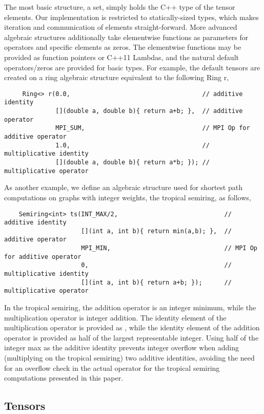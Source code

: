 The most basic structure, a set, simply holds the C++ type of the tensor elements.
Our implementation is restricted to statically-sized types, which makes iteration and communication of elements straight-forward.
More advanced algebraic structures additionally take elementwise functions as parameters for operators and specific elements as zeros.
The elementwise functions may be provided as function pointers or C++11 Lambdas, and the natural default operators/zeros are provided for basic types.
For example, the default tensors are created on a ring algebraic structure equivalent to the following {\kwstyle Ring} {\CD r},
\begin{lstlisting}
     Ring<> r(0.0,                                    // additive identity
              [](double a, double b){ return a+b; },  // additive operator
              MPI_SUM,                                // MPI Op for additive operator
              1.0,                                    // multiplicative identity
              [](double a, double b){ return a*b; }); // multiplicative operator
\end{lstlisting}
As another example, we define an algebraic structure used for shortest path computations on graphs with integer weights, the tropical semiring, as follows,
\begin{lstlisting}
    Semiring<int> ts(INT_MAX/2,                             // additive identity
                     [](int a, int b){ return min(a,b); },  // additive operator
                     MPI_MIN,                               // MPI Op for additive operator
                     0,                                     // multiplicative identity
                     [](int a, int b){ return a+b; });      // multiplicative operator
\end{lstlisting}
In the tropical semiring, the addition operator is an integer minimum, while the multiplication operator is integer addition.
The identity element of the multiplication operator is provided as , while the identity element of the addition operator is provided as half of the largest representable integer.
Using half of the integer max as the additive identity prevents integer overflow when adding (multiplying on the tropical semiring) two additive identities, avoiding the need for an overflow check in the actual operator for the tropical semiring computations presented in this paper. 





\subsection{Tensors}

